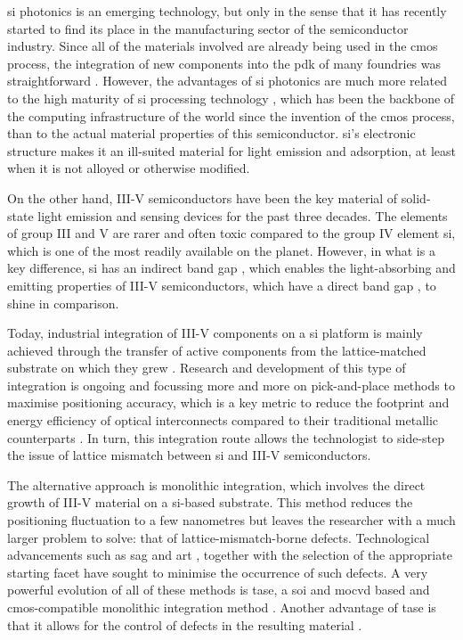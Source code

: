 \Acl{si} photonics is an emerging technology, but only in the sense that it has recently started to find its place in the manufacturing sector of the semiconductor industry. Since all of the materials involved are already being used in the \acs{cmos} process, the integration of new components into the \acf{pdk} of many foundries was straightforward \cite{Shi2022, Siew2021, Novack2014}. However, the advantages of \acl{si} photonics are much more related to the high maturity of \acl{si} processing technology \cite{Novack2014}, which has been the backbone of the computing infrastructure of the world since the invention of the \acs{cmos} process, than to the actual material properties of this semiconductor. \Acl{si}'s electronic structure makes it an ill-suited material for light emission and adsorption, at least when it is not alloyed or otherwise modified.

On the other hand, III-V semiconductors have been the key material of solid-state light emission \cite{Schlereth1996, Nakamura1994} and sensing \cite{Ting2019, Liang2022} devices for the past three decades. The elements of group III and V are rarer and often toxic compared to the group IV element \acl{si}, which is one of the most readily available on the planet. However, in what is a key difference, \acl{si} has an indirect band gap \cite{Chelikowsky1974}, which enables the light-absorbing and emitting properties of III-V semiconductors, which have a direct band gap \cite{Khanin2005}, to shine in comparison.

Today, industrial integration of III-V components on a \acl{si} platform is mainly achieved through the transfer of active components from the lattice-matched substrate on which they grew \cite{Han2022}. Research and development of this type of integration is ongoing and focussing more and more on pick-and-place methods \cite{McPhillimy2020} to maximise positioning accuracy, which is a key metric to reduce the footprint and energy efficiency of optical interconnects compared to their traditional metallic counterparts \cite{Miller2000, Miller2009}. In turn, this integration route allows the technologist to side-step the issue of lattice mismatch between \acl{si} and III-V semiconductors.

The alternative approach is monolithic integration, which involves the direct growth of III-V material on a \acl{si}-based substrate. This method reduces the positioning fluctuation to a few nanometres but leaves the researcher with a much larger problem to solve: that of lattice-mismatch-borne defects. Technological advancements such as \acf{sag} and \acf{art} \cite{Kunert2016, Fiorenza2019}, together with the selection of the appropriate starting facet \cite{Kunert2018} have sought to minimise the occurrence of such defects. A very powerful evolution of all of these methods is \acf{tase}, a \acf{soi} and \acf{mocvd} based and \acs{cmos}-compatible \cite{Svensson2023} monolithic integration method \cite{borgTASEp2018, Schmid2015}. Another advantage of \acs{tase} is that it allows for the control of defects in the resulting material \cite{Knoedler2017, Staudinger2018, Han2020}. 

